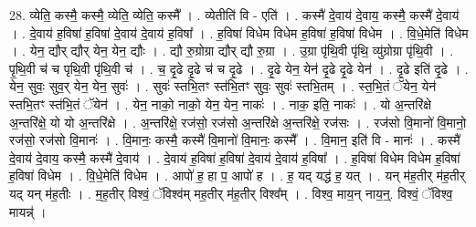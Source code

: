 \documentclass[17pt]{extarticle}
\begin{document}
28. व्येति॒ कस्मै॒ कस्मै॒ व्येति॒ व्येति॒ कस्मै᳚ । . व्येतीति॑ वि - एति॑ । . कस्मै॑ दे॒वाय॑ दे॒वाय॒ कस्मै॒ कस्मै॑ दे॒वाय॑ । . दे॒वाय॑ ह॒विषा॑ ह॒विषा॑ दे॒वाय॑ दे॒वाय॑ ह॒विषा᳚ । . ह॒विषा॑ विधेम विधेम ह॒विषा॑ ह॒विषा॑ विधेम । . वि॒धे॒मेति॑ विधेम । . येन॒ द्यौर् द्यौर् येन॒ येन॒ द्यौः । . द्यौ रु॒ग्रोग्रा द्यौर् द्यौ रु॒ग्रा । . उ॒ग्रा पृ॑थि॒वी पृ॑थि॒ व्यु॑ग्रोग्रा पृ॑थि॒वी । . पृ॒थि॒वी च॑ च पृथि॒वी पृ॑थि॒वी च॑ । . च॒ दृ॒ढे दृ॒ढे च॑ च दृ॒ढे । . दृ॒ढे येन॒ येन॑ दृ॒ढे दृ॒ढे येन॑ । . दृ॒ढे इति॑ दृ॒ढे । . येन॒ सुवः॒ सुव॒र् येन॒ येन॒ सुवः॑ । . सुवः॑ स्तभि॒तꣳ स्त॑भि॒तꣳ सुवः॒ सुवः॑ स्तभि॒तम् । . स्त॒भि॒तं ॅयेन॒ येन॑ स्तभि॒तꣳ स्त॑भि॒तं ॅयेन॑ । . येन॒ नाको॒ नाको॒ येन॒ येन॒ नाकः॑ । . नाक॒ इति॒ नाकः॑ । . यो अ॒न्तरि॑क्षे अ॒न्तरि॑क्षे॒ यो यो अ॒न्तरि॑क्षे । . अ॒न्तरि॑क्षे॒ रज॑सो॒ रज॑सो अ॒न्तरि॑क्षे अ॒न्तरि॑क्षे॒ रज॑सः । . रज॑सो वि॒मानो॑ वि॒मानो॒ रज॑सो॒ रज॑सो वि॒मानः॑ । . वि॒मानः॒ कस्मै॒ कस्मै॑ वि॒मानो॑ वि॒मानः॒ कस्मै᳚ । . वि॒मान॒ इति॑ वि - मानः॑ । . कस्मै॑ दे॒वाय॑ दे॒वाय॒ कस्मै॒ कस्मै॑ दे॒वाय॑ । . दे॒वाय॑ ह॒विषा॑ ह॒विषा॑ दे॒वाय॑ दे॒वाय॑ ह॒विषा᳚ । . ह॒विषा॑ विधेम विधेम ह॒विषा॑ ह॒विषा॑ विधेम । . वि॒धे॒मेति॑ विधेम । . आपो॑ ह॒ हा प॒ आपो॑ ह । . ह॒ यद् यद्ध॑ ह॒ यत् । . यन् म॑ह॒तीर् म॑ह॒तीर् यद् यन् म॑ह॒तीः । . म॒ह॒तीर् विश्वं॒ ॅविश्व॑म् मह॒तीर् म॑ह॒तीर् विश्व᳚म् । . विश्व॒ माय॒न् नाय॒न्॒. विश्वं॒ ॅविश्व॒ मायन्न्॑ । \newline
\end{document}
